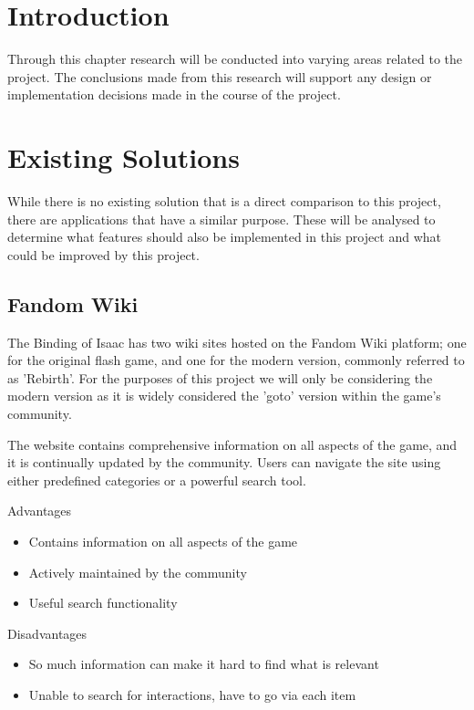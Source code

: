 \section{Introduction}
Through this chapter research will be conducted into varying areas related to the project. The conclusions made from 
this research will support any design or implementation decisions made in the course of the project.
\section{Existing Solutions}
While there is no existing solution that is a direct comparison to this project, there are applications that have a 
similar purpose. These will be analysed to determine what features should also be implemented in this project and what 
could be improved by this project.
\subsection*{Fandom Wiki}
The Binding of Isaac has two wiki sites hosted on the Fandom Wiki platform; one for the original flash 
game\cite{BindingIsaacWiki}, and one for the modern version, commonly referred to as 'Rebirth'\cite{BindingIsaacRebirth}.
For the purposes of this project we will only be considering the modern version as it is widely considered the 'goto' 
version within the game's community.\par The website contains comprehensive information on all aspects of the game, 
and it is continually updated by the community. Users can navigate the site using either predefined categories or a 
powerful search tool. \par
Advantages
\begin{itemize}
    \item Contains information on all aspects of the game
    \item Actively maintained by the community
    \item Useful search functionality
\end{itemize}
Disadvantages
\begin{itemize}
    \item So much information can make it hard to find what is relevant
    \item Unable to search for interactions, have to go via each item 
\end{itemize}
